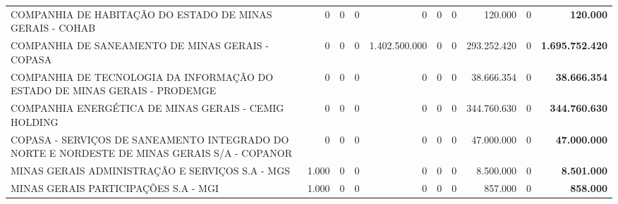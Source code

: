 \documentclass{article}
\begin{document}
\begin{landscape}
\begin{longtable}[c]{m{5.0cm}|m{1.75cm}|m{1.75cm}|m{1.75cm}|m{1.75cm}|m{1.75cm}|m{1.75cm}|m{1.75cm}|m{1.75cm}|m{1.0cm}}
\multicolumn{1}{L{5cm}|}{COMPANHIA DE HABITAÇÃO DO ESTADO DE MINAS GERAIS - COHAB} & \multicolumn{1}{r|}{    0} & \multicolumn{1}{r|}{0} & \multicolumn{1}{r|}{          0} & \multicolumn{1}{r|}{            0} & \multicolumn{1}{r|}{0} & \multicolumn{1}{r|}{0} & \multicolumn{1}{r|}{120.000} & \multicolumn{1}{r|}{          0} & \multicolumn{1}{r}{ \textbf{120.000}} \\
\multicolumn{1}{L{5cm}|}{COMPANHIA DE SANEAMENTO DE MINAS GERAIS - COPASA} & \multicolumn{1}{r|}{    0} & \multicolumn{1}{r|}{0} & \multicolumn{1}{r|}{          0} & \multicolumn{1}{r|}{1.402.500.000} & \multicolumn{1}{r|}{0} & \multicolumn{1}{r|}{0} & \multicolumn{1}{r|}{293.252.420} & \multicolumn{1}{r|}{          0} & \multicolumn{1}{r}{ \textbf{1.695.752.420}} \\
\multicolumn{1}{L{5cm}|}{COMPANHIA DE TECNOLOGIA DA INFORMAÇÃO DO ESTADO DE MINAS GERAIS - PRODEMGE} & \multicolumn{1}{r|}{    0} & \multicolumn{1}{r|}{0} & \multicolumn{1}{r|}{          0} & \multicolumn{1}{r|}{            0} & \multicolumn{1}{r|}{0} & \multicolumn{1}{r|}{0} & \multicolumn{1}{r|}{38.666.354} & \multicolumn{1}{r|}{          0} & \multicolumn{1}{r}{ \textbf{38.666.354}} \\
\multicolumn{1}{L{5cm}|}{COMPANHIA ENERGÉTICA DE MINAS GERAIS - CEMIG HOLDING} & \multicolumn{1}{r|}{    0} & \multicolumn{1}{r|}{0} & \multicolumn{1}{r|}{          0} & \multicolumn{1}{r|}{            0} & \multicolumn{1}{r|}{0} & \multicolumn{1}{r|}{0} & \multicolumn{1}{r|}{344.760.630} & \multicolumn{1}{r|}{          0} & \multicolumn{1}{r}{ \textbf{344.760.630}} \\
\multicolumn{1}{L{5cm}|}{COPASA - SERVIÇOS DE SANEAMENTO INTEGRADO DO NORTE E NORDESTE DE MINAS GERAIS S/A - COPANOR} & \multicolumn{1}{r|}{    0} & \multicolumn{1}{r|}{0} & \multicolumn{1}{r|}{          0} & \multicolumn{1}{r|}{            0} & \multicolumn{1}{r|}{0} & \multicolumn{1}{r|}{0} & \multicolumn{1}{r|}{47.000.000} & \multicolumn{1}{r|}{          0} & \multicolumn{1}{r}{ \textbf{47.000.000}} \\
\multicolumn{1}{L{5cm}|}{MINAS GERAIS ADMINISTRAÇÃO E SERVIÇOS S.A - MGS} & \multicolumn{1}{r|}{1.000} & \multicolumn{1}{r|}{0} & \multicolumn{1}{r|}{          0} & \multicolumn{1}{r|}{            0} & \multicolumn{1}{r|}{0} & \multicolumn{1}{r|}{0} & \multicolumn{1}{r|}{8.500.000} & \multicolumn{1}{r|}{          0} & \multicolumn{1}{r}{ \textbf{8.501.000}} \\
\multicolumn{1}{L{5cm}|}{MINAS GERAIS PARTICIPAÇÕES S.A - MGI} & \multicolumn{1}{r|}{1.000} & \multicolumn{1}{r|}{0} & \multicolumn{1}{r|}{          0} & \multicolumn{1}{r|}{            0} & \multicolumn{1}{r|}{0} & \multicolumn{1}{r|}{0} & \multicolumn{1}{r|}{857.000} & \multicolumn{1}{r|}{          0} & \multicolumn{1}{r}{ \textbf{858.000}} \\

\end{longtable}
\end{landscape}
\end{document}
